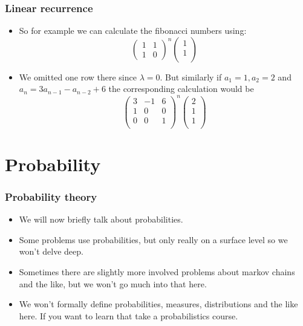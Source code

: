 \documentclass{beamer}
\newcommand\p[1]{\left(#1\right)}
\begin{document}
\begin{frame}[plain]
\frametitle{Linear recurrence}

\begin{itemize}

\item So for example we can calculate the fibonacci numbers using:
\[\p{\begin{matrix}1 & 1\\1 & 0\end{matrix}}^n\p{\begin{matrix}1\\1\\\end{matrix}}\]

\item We omitted one row there since $\lambda = 0$. But similarly if $a_1 = 1, a_2 = 2$ and $a_n = 3a_{n-1} - a_{n - 2} + 6$ the corresponding calculation would be
\[\p{\begin{matrix}3 & -1 & 6\\1 & 0 & 0\\0 & 0 & 1\\\end{matrix}}^n\p{\begin{matrix}2\\1\\1\\\end{matrix}}\]

\end{itemize}

\section*{Probability}

\end{frame}
\begin{frame}[plain]
\frametitle{Probability theory}

\begin{itemize}

\item We will now briefly talk about probabilities.

\item Some problems use probabilities, but only really on a surface level so we won't delve deep.

\item Sometimes there are slightly more involved problems about markov chains and the like, but we won't go much into that here.

\item We won't formally define probabilities, measures, distributions and the like here. If you want to learn that take a probabilistics course.

\end{itemize}

\end{frame}
\end{document}
